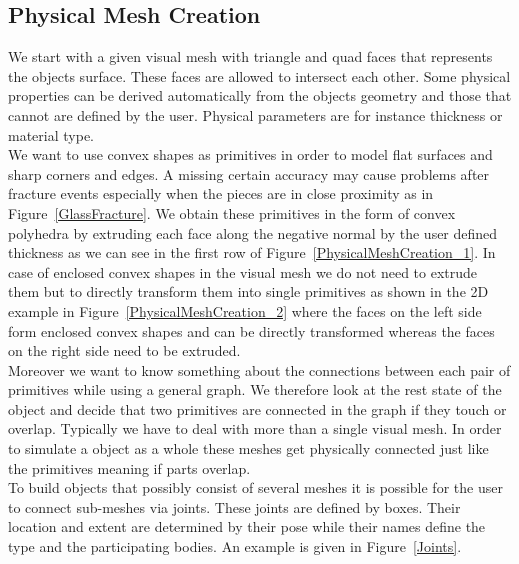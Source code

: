 \documentclass[
	11pt, 
	DIV10,
	a4paper, 
	oneside, 
	headings=normal, 
	captions=tableheading,
	final, 
	numbers=noenddot
]{scrartcl}
\begin{document}
\subsection{Physical Mesh Creation}
	We start with a given visual mesh with triangle and quad faces that represents the objects surface. These faces are allowed to intersect each other. Some physical properties can be derived automatically from the objects geometry and those that cannot are defined by the user. Physical parameters are for instance thickness or material type.\\
	We want to use convex shapes as primitives in order to model flat surfaces and sharp corners and edges. A missing certain accuracy may cause problems after fracture events especially when the pieces are in close proximity as in Figure~\ref{GlassFracture}. We obtain these primitives in the form of convex polyhedra by extruding each face along the negative normal by the user defined thickness as we can see in the first row of Figure~\ref{PhysicalMeshCreation_1}. In case of enclosed convex shapes in the visual mesh we do not need to extrude them but to directly transform them into single primitives as shown in the 2D example in Figure~\ref{PhysicalMeshCreation_2} where the faces on the left side form enclosed convex shapes and can be directly transformed whereas the faces on the right side need to be extruded.\\
	Moreover we want to know something about the connections between each pair of primitives while using a general graph. We therefore look at the rest state of the object and decide that two primitives are connected in the graph if they touch or overlap. Typically we have to deal with more than a single visual mesh. In order to simulate a object as a whole these meshes get physically connected just like the primitives meaning if parts overlap. \\
	To build objects that possibly consist of several meshes it is possible for the user to connect sub-meshes via joints. These joints are defined by boxes. Their location and extent are determined by their pose while their names define the type and the participating bodies. An example is given in Figure~\ref{Joints}. \\
\end{document}
